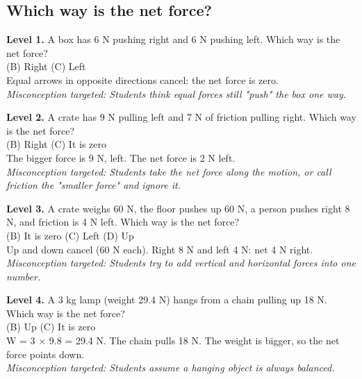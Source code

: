 \documentclass[11pt]{article}
\begin{document}
\subsection*{Which way is the net force?}
\noindent\textbf{Level 1.} A box has 6 N pushing right and 6 N pushing left. Which way is the net force?\\  \quad (B) Right \quad (C) Left\\  \quad Equal arrows in opposite directions cancel: the net force is zero.\\ \textit{Misconception targeted: Students think equal forces still "push" the box one way.}\par\medskip
\noindent\textbf{Level 2.} A crate has 9 N pulling left and 7 N of friction pulling right. Which way is the net force?\\  \quad (B) Right \quad (C) It is zero\\  \quad The bigger force is 9 N, left. The net force is 2 N left.\\ \textit{Misconception targeted: Students take the net force along the motion, or call friction the "smaller force" and ignore it.}\par\medskip
\noindent\textbf{Level 3.} A crate weighs 60 N, the floor pushes up 60 N, a person pushes right 8 N, and friction is 4 N left. Which way is the net force?\\  \quad (B) It is zero \quad (C) Left \quad (D) Up\\  \quad Up and down cancel (60 N each). Right 8 N and left 4 N: net 4 N right.\\ \textit{Misconception targeted: Students try to add vertical and horizontal forces into one number.}\par\medskip
\noindent\textbf{Level 4.} A 3 kg lamp (weight 29.4 N) hangs from a chain pulling up 18 N. Which way is the net force?\\  \quad (B) Up \quad (C) It is zero\\  \quad W = 3 $\times$ 9.8 = 29.4 N. The chain pulls 18 N. The weight is bigger, so the net force points down.\\ \textit{Misconception targeted: Students assume a hanging object is always balanced.}\par\medskip
\end{document}
